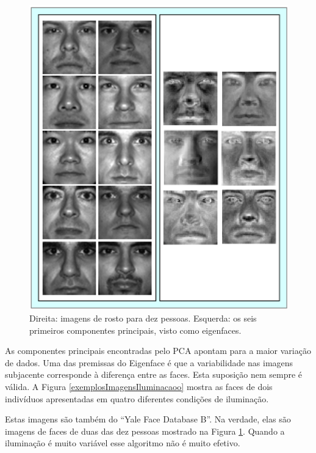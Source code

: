 	\begin{figure}[hbt]
		\begin{center}
			\includegraphics[width=12cm]{figuras/2.FundamentacaoTeorica/eigenfaces.png}
		\end{center}
		\caption{Direita: imagens de rosto para dez pessoas. Esquerda: os seis primeiros componentes principais, visto como eigenfaces.}
		\label{exemploEigenfaces}
	\end{figure}

As componentes principais encontradas pelo PCA apontam para a maior variação de dados. Uma das premissas do Eigenface é que a variabilidade nas imagens subjacente corresponde à diferença entre as faces. Esta suposição nem sempre é válida. A Figura \ref{exemplosImagensIluminacaoo} mostra as faces de dois indivíduos apresentadas em quatro diferentes condições de iluminação.

Estas imagens são também do ``Yale Face Database B''. Na verdade, elas são imagens de faces de duas das dez pessoas mostrado na Figura \ref{exemploEigenfaces}. Quando a iluminação é muito variável esse algoritmo não é muito efetivo.

